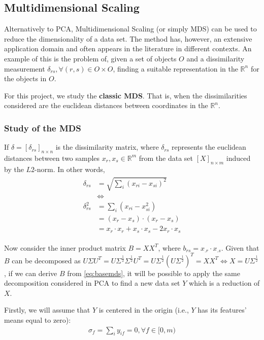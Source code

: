 \documentclass[12pt]{article}
\begin{document}
\subsection{Multidimensional Scaling}

Alternatively to PCA, Multidimensional Scaling (or simply MDS) can be used to reduce the dimensionality of a data set. The method has, however, an extensive application domain and often appears in the literature in different contexts. An example of this is the problem of, given a set of objects $O$ and a dissimilarity measurement $\delta_{rs}, \forall (r, s) \in O\times O$, finding a suitable representation in the $\mathbb{R}^n$ for the objects in $O$. \cite{cox2001}

For this project, we study the \textbf{classic MDS}. That is, when the dissimilarities considered are the euclidean distances between coordinates in the $\mathbb{R}^n$.

\subsubsection{Study of the MDS}

If $\delta = [\delta_{rs}]_{n\times n}$ is the dissimilarity matrix, where $\delta_{rs}$ represents the euclidean distances between two samples $x_r, x_s\in \mathbb{R}^m$ from the data set $[X]_{n\times m}$ induced by the $L2$-norm. In other words,
\begin{align}
\label{eq:basemds}
\begin{split}
  \delta_{rs}  &= \sqrt{\sum_i (x_{ri}-x_{si})^2} \\
  &\iff \\
  \delta_{rs}^2 &= \sum_i (x_{ri}-x_{si}^2) \\
  &= (x_r-x_s)\cdot (x_r-x_s) \\
  &= x_r\cdot x_r + x_s\cdot x_s -2x_r\cdot x_s
\end{split}
\end{align}

Now consider the inner product matrix $B=XX^T$, where $b_{rs}=x_{.r}\cdot x_{.s}$. Given that $B$ can be decomposed as $U\Sigma U^T=U\Sigma^\frac{1}{2} \Sigma^\frac{1}{2} U^T=U\Sigma^\frac{1}{2} (U\Sigma^\frac{1}{2})^T = XX^T\iff X=U\Sigma^\frac{1}{2}$, if we can derive $B$ from \ref{eq:basemds}, it will be possible to apply the same decomposition considered in PCA to find a new data set $Y$ which is a reduction of $X$. \cite{cox2001}

Firstly, we will assume that $Y$ is centered in the origin (i.e., $Y$ has its features' means equal to zero):
\begin{align}
\sigma_f = \sum_i y_{if} = 0, \forall f\in [0, m)
\end{align}
\end{document}
